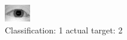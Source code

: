 \begin{figure}[h!]
\begin{center}
\includegraphics[width=0.60\columnwidth]{figures/ID903_class_1_target_2.png}
\end{center}
\caption{ Classification: 1 actual target: 2}
\label{fig:ID903_class_1_target_2}
\end{figure}

